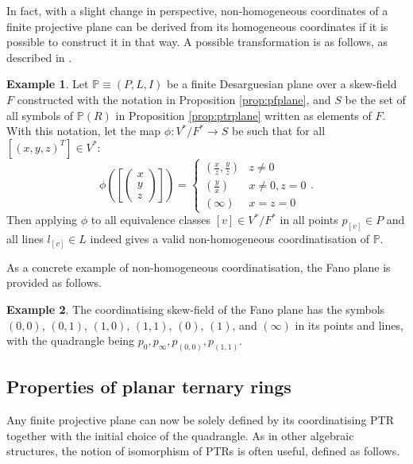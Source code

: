 \documentclass{report}
\renewcommand{\P}{\mathbb{P}}
\theoremstyle{definition}\newtheorem*{definition}{Definition}
\theoremstyle{definition}\newtheorem*{example}{Example}
\theoremstyle{remark}\newtheorem*{remark}{Remark}
\begin{document}
In fact, with a slight change in perspective, non-homogeneous coordinates of a finite projective plane can be derived from its homogeneous coordinates if it is possible to construct it in that way. A possible transformation is as follows, as described in \cite{coordinatisation}.

\begin{example}
Let $ \P \equiv (P, L, I) $ be a finite Desarguesian plane over a skew-field $ F $ constructed with the notation in Proposition \ref{prop:pfplane}, and $ S $ be the set of all symbols of $ \P(R) $ in Proposition \ref{prop:ptrplane} written as elements of $ F $. With this notation, let the map $ \phi : V^* / F^* \to S $ be such that for all $ [(x, y, z)^T] \in V^* $: $$ \phi \left( \left[ \begin{pmatrix} x \\ y \\ z \end{pmatrix} \right] \right) = \begin{cases} (\frac{x}{z}, \frac{y}{z}) & z \ne 0 \\ (\frac{y}{x}) & x \ne 0, z = 0 \\ (\infty) & x = z = 0 \end{cases}. $$ Then applying $ \phi $ to all equivalence classes $ [v] \in V^* / F^* $ in all points $ p_{[v]} \in P $ and all lines $ l_{[v]} \in L $ indeed gives a valid non-homogeneous coordinatisation of $ \P $.
\end{example}

As a concrete example of non-homogeneous coordinatisation, the Fano plane is provided as follows.

\begin{example}
The coordinatising skew-field of the Fano plane has the symbols $ (0, 0) $, $ (0, 1) $, $ (1, 0) $, $ (1, 1) $, $ (0) $, $ (1) $, and $ (\infty) $ in its points and lines, with the quadrangle being $ p_0, p_\infty, p_{(0, 0)}, p_{(1, 1)} $.
\end{example}

\subsection{Properties of planar ternary rings}

Any finite projective plane can now be solely defined by its coordinatising PTR together with the initial choice of the quadrangle. As in other algebraic structures, the notion of isomorphism of PTRs is often useful, defined as follows.
\end{document}
